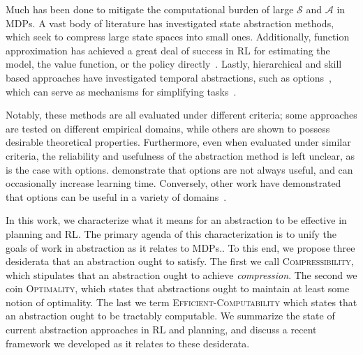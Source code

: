Much has been done to mitigate the computational burden of large $\mathcal{S}$ and $\mathcal{A}$ in \acp{MDP}. A vast body of literature has investigated state abstraction methods, which seek to compress large state spaces into small ones. Additionally, function approximation has achieved a great deal of success in \ac{RL} for estimating the model, the value function, or the policy directly~\cite{mnih2015human,sutton1999policy,baird1995residual}. Lastly, hierarchical and skill based approaches have investigated temporal abstractions, such as options~\cite{sutton1999between}, which can serve as mechanisms for simplifying tasks~\cite{konidaris2015constructing}.

Notably, these methods are all evaluated under different criteria; some approaches are tested on different empirical domains, while others are shown to possess desirable theoretical properties. Furthermore, even when evaluated under similar criteria, the reliability and usefulness of the abstraction method is left unclear, as is the case with options. \cite{jong2008utility} demonstrate that options are not always useful, and can occasionally increase learning time. Conversely, other work have demonstrated that options can be useful in a variety of domains~\cite{sutton1999between}.


In this work, we characterize what it means for an abstraction to be effective in planning and \ac{RL}. The primary agenda of this characterization is to unify the goals of work in abstraction as it relates to \acp{MDP}.. To this end, we propose three desiderata that an abstraction ought to satisfy. The first we call \textsc{Compressibility}, which stipulates that an abstraction ought to achieve {\it compression}. The second we coin \textsc{Optimality}, which states that abstractions ought to maintain at least some notion of optimality. The last we term \textsc{Efficient-Computability} which states that an abstraction ought to be tractably computable. We summarize the state of current abstraction approaches in \ac{RL} and planning, and discuss a recent framework we developed as it relates to these desiderata.


